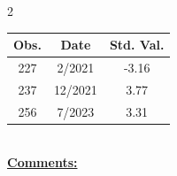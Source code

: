 
\bigskip 
\begin{multicols}{2}{ 
\begin{tabular}{ccc}
\hline  Obs.  &  Date &  Std. Val. \\ 
\hline 
                      227 &        2/2021 &         -3.16 \vspace{-.12in} \\  
                      237 &       12/2021 &          3.77 \vspace{-.12in} \\  
                      256 &        7/2023 &          3.31 \vspace{-.12in} \\  
 \end{tabular} 
\\ 
 \columnbreak 
 \singlespacing 
 \underline{\textbf{Comments:}} \\ 
 \bigskip       

 } 
\end{multicols} 
